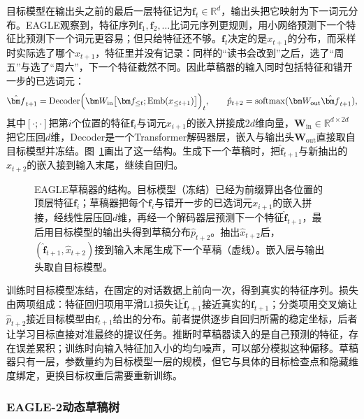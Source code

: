 目标模型在输出头之前的最后一层特征记为$\bm f_t\in\mathbb R^{d}$，输出头把它映射为下一词元分布。EAGLE观察到，特征序列$\bm f_1,\bm f_2,\ldots$比词元序列更规则，用小网络预测下一个特征比预测下一个词元更容易；但只给特征还不够。$\bm f_t$决定的是$x_{t+1}$的分布，而采样时实际选了哪个$x_{t+1}$，特征里并没有记录：同样的“读书会改到”之后，选了“周五”与选了“周六”，下一个特征截然不同。因此草稿器的输入同时包括特征和错开一步的已选词元：
\begin{equation}
 \hat{\bm f}_{t+1}=\operatorname{Decoder}\Bigl(\bm W_{\mathrm{in}}\bigl[\bm f_{\leq t};\operatorname{Emb}(x_{\leq t+1})\bigr]\Bigr)_{t},
 \qquad \hat p_{t+2}=\operatorname{softmax}(\bm W_{\mathrm{out}}\hat{\bm f}_{t+1}),
 \label{eq:nlp-inference-eagle}
\end{equation}
其中$[\cdot;\cdot]$把第$i$个位置的特征$\bm f_i$与词元$x_{i+1}$的嵌入拼接成$2d$维向量，$\bm W_{\mathrm{in}}\in\mathbb R^{d\times2d}$把它压回$d$维，Decoder是一个Transformer解码器层，嵌入与输出头$\bm W_{\mathrm{out}}$直接取自目标模型并冻结。图~\ref{fig:nlp-inference-eagle}画出了这一结构。生成下一个草稿时，把$\hat{\bm f}_{t+1}$与新抽出的$\hat x_{t+2}$的嵌入接到输入末尾，继续自回归。

\begin{figure}[htbp]
  \centering
  
  \caption{EAGLE草稿器的结构。目标模型（冻结）已经为前缀算出各位置的顶层特征$\bm f_i$；草稿器把每个$\bm f_i$与错开一步的已选词元$x_{i+1}$的嵌入拼接，经线性层压回$d$维，再经一个解码器层预测下一个特征$\hat{\bm f}_{t+1}$，最后用目标模型的输出头得到草稿分布$\hat p_{t+2}$。抽出$\hat x_{t+2}$后，$(\hat{\bm f}_{t+1},\hat x_{t+2})$接到输入末尾生成下一个草稿（虚线）。嵌入层与输出头取自目标模型。}
  \label{fig:nlp-inference-eagle}
\end{figure}

训练时目标模型冻结，在固定的对话数据上前向一次，得到真实的特征序列。损失由两项组成：特征回归项用平滑L1损失让$\hat{\bm f}_{t+1}$接近真实的$\bm f_{t+1}$；分类项用交叉熵让$\hat p_{t+2}$接近目标模型由$\bm f_{t+1}$给出的分布。前者提供逐步自回归所需的稳定坐标，后者让学习目标直接对准最终的提议任务。推断时草稿器读入的是自己预测的特征，存在误差累积；训练时向输入特征加入小的均匀噪声，可以部分模拟这种偏移。草稿器只有一层，参数量约为目标模型一层的规模，但它与具体的目标检查点和隐藏维度绑定，更换目标权重后需要重新训练。

\subsubsection{EAGLE-2动态草稿树}
\label{sec:nlp-inference-eagle2}

